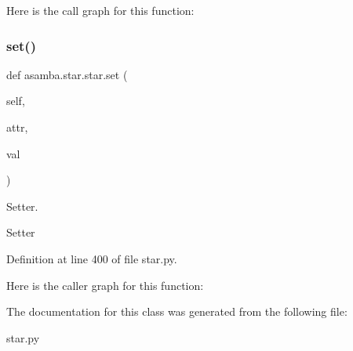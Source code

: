 Here is the call graph for this function\+:
\mbox{\label{classasamba_1_1star_1_1star_af0cfdd4049f081617d13919decddc5af}} 
\subsubsection{\texorpdfstring{set()}{set()}}
{\footnotesize\ttfamily def asamba.\+star.\+star.\+set (\begin{DoxyParamCaption}\item[{}]{self,  }\item[{}]{attr,  }\item[{}]{val }\end{DoxyParamCaption})}



Setter. 

\begin{DoxyVerb}Setter \end{DoxyVerb}
 

Definition at line 400 of file star.\+py.

Here is the caller graph for this function\+:


The documentation for this class was generated from the following file\+:\begin{DoxyCompactItemize}
\item 
star.\+py\end{DoxyCompactItemize}
